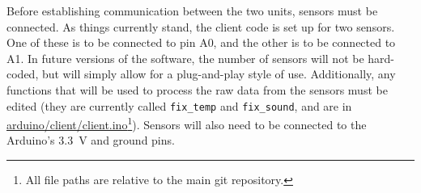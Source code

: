 Before establishing communication between the two units, sensors must be connected.
As things currently stand, the client code is set up for two sensors.  One of these is to be connected to pin A0, and the other is to be connected to A1.
In future versions of the software, the number of sensors will not be hard-coded, but will simply allow for a plug-and-play style of use.
Additionally, any functions that will be used to process the raw data from the sensors must be edited (they are currently called \lstinline[language=C++]{fix_temp} and \lstinline[language=C++]{fix_sound}, and are in \url{arduino/client/client.ino}\footnote{All file paths are relative to the main git repository.}).
Sensors will also need to be connected to the Arduino's \SI{3.3}{\volt} and ground pins.

